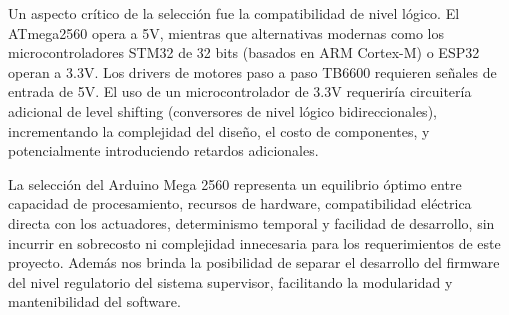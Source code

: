 Un aspecto crítico de la selección fue la compatibilidad de nivel lógico. El ATmega2560 opera a 5V, mientras que alternativas modernas como los microcontroladores STM32 de 32 bits (basados en ARM Cortex-M) o ESP32 operan a 3.3V. Los drivers de motores paso a paso TB6600 requieren señales de entrada de 5V. El uso de un microcontrolador de 3.3V requeriría circuitería adicional de level shifting (conversores de nivel lógico bidireccionales), incrementando la complejidad del diseño, el costo de componentes, y potencialmente introduciendo retardos adicionales.

La selección del Arduino Mega 2560 representa un equilibrio óptimo entre capacidad de procesamiento, recursos de hardware, compatibilidad eléctrica directa con los actuadores, determinismo temporal y facilidad de desarrollo, sin incurrir en sobrecosto ni complejidad innecesaria para los requerimientos de este proyecto. Además nos brinda la posibilidad de separar el desarrollo del firmware del nivel regulatorio del sistema supervisor, facilitando la modularidad y mantenibilidad del software.
